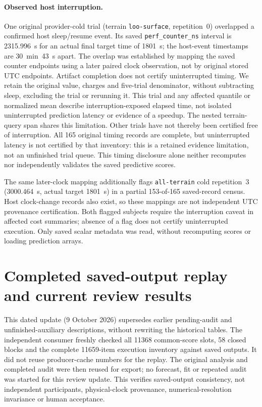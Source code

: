 \paragraph{Observed host interruption.}
One original provider-cold trial (terrain \texttt{loo-surface}, repetition~0)
overlapped a confirmed host sleep/resume event. Its saved
\texttt{perf\_counter\_ns} interval is 2315.996~s for an actual final target
time of 1801~s; the host-event timestamps are 30~min~43~s apart.
The overlap was established by mapping the saved counter endpoints using
a later paired clock observation, not by original stored UTC endpoints.
Artifact completion does not certify uninterrupted timing. We retain the
original value, charges and five-trial denominator, without subtracting
sleep, excluding the trial or rerunning it. This trial and any affected
quantile or normalized mean describe interruption-exposed elapsed time,
not isolated uninterrupted prediction latency or evidence of a speedup.
The nested terrain-query span shares this limitation. Other trials have
not thereby been certified free of interruption. All 165 original timing
records are complete, but uninterrupted latency is not certified by that
inventory: this is a retained evidence limitation, not an unfinished trial queue.
This timing disclosure alone neither
recomputes nor independently validates the saved predictive scores.

The same later-clock mapping additionally flags \texttt{all-terrain} cold
repetition~3 (3000.464~s, actual target 1801~s) in a partial 153-of-165
saved-record census. Host clock-change records also exist, so these mappings
are not independent UTC provenance certification. Both flagged subjects
require the interruption caveat in affected cost summaries; absence of a
flag does not certify uninterrupted execution. Only saved scalar metadata
was read, without recomputing scores or loading prediction arrays.



\section{Completed saved-output replay and current review results}
\label{sec:audited-review-update}\hypertarget{sec:audited-review-update}{}
This dated update (9 October 2026) supersedes earlier pending-audit and
unfinished-auxiliary descriptions, without rewriting the historical tables.
The independent consumer freshly checked all 11368 common-score slots,
58 closed blocks and the complete 11659-item execution inventory against
saved outputs. It did not reuse producer-cache numbers for the replay.
The original analysis and completed audit were then reused for export;
no forecast, fit or repeated audit was started for this review update.
This verifies saved-output consistency, not independent participants,
physical-clock provenance, numerical-resolution invariance or human acceptance.

